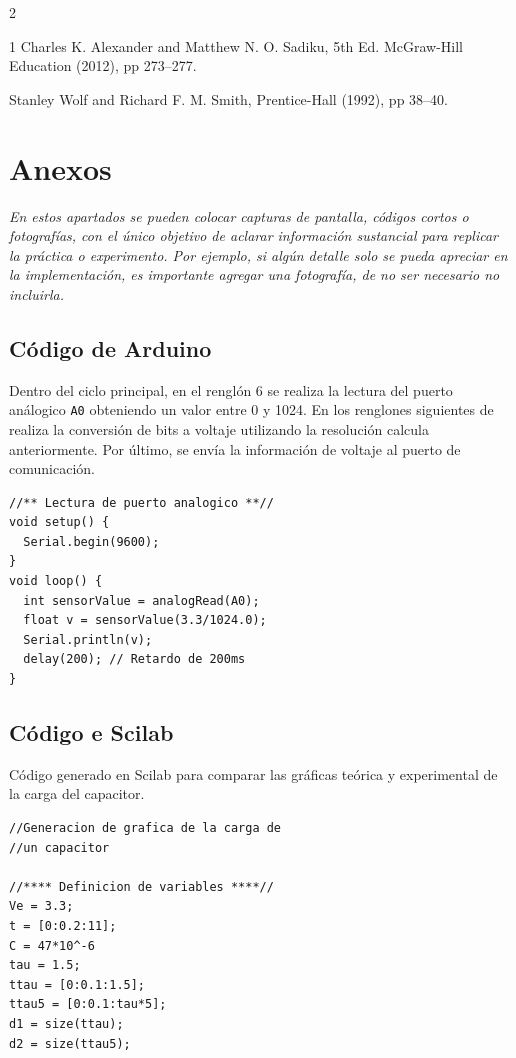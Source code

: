 \documentclass[11pt,letterpaper]{article}
\begin{document}
\begin{multicols}{2}
\begin{thebibliography}{1} %
 Charles K. Alexander and Matthew N. O. Sadiku,
 5th Ed.
\newblock McGraw-Hill Education (2012),
\newblock pp 273--277.

 Stanley Wolf and Richard F. M. Smith,
\newblock Prentice-Hall (1992),
\newblock pp 38--40.
\end{thebibliography}

\section*{Anexos}
\textit{En estos apartados se pueden colocar capturas de pantalla, códigos cortos o fotografías, con el único objetivo de aclarar información sustancial para replicar la práctica o experimento. Por ejemplo, si algún detalle solo se pueda apreciar en la implementación, es importante agregar una fotografía, de no ser necesario no incluirla.}
\subsection{Código de Arduino}
Dentro del ciclo principal, en el renglón 6 se realiza la lectura del puerto análogico \texttt{A0} obteniendo un valor entre 0 y 1024. En los renglones siguientes de realiza la conversión de bits a voltaje utilizando la resolución calcula anteriormente. Por último, se envía la información de voltaje al puerto de comunicación.
\begin{verbatim}
//** Lectura de puerto analogico **//
void setup() {
  Serial.begin(9600);
}
void loop() {
  int sensorValue = analogRead(A0);
  float v = sensorValue(3.3/1024.0);
  Serial.println(v); 
  delay(200); // Retardo de 200ms
}
\end{verbatim}

\subsection{Código e Scilab}
Código generado en Scilab para comparar las gráficas teórica y experimental de la carga del capacitor.
\begin{verbatim}
//Generacion de grafica de la carga de
//un capacitor

//**** Definicion de variables ****//
Ve = 3.3;
t = [0:0.2:11];
C = 47*10^-6
tau = 1.5;
ttau = [0:0.1:1.5];
ttau5 = [0:0.1:tau*5];
d1 = size(ttau);
d2 = size(ttau5);


\end{verbatim}
\end{multicols}
\end{document}
